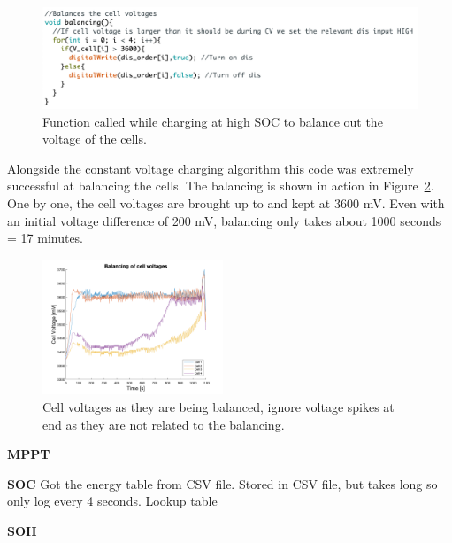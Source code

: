 \documentclass[a4paper]{article}
\begin{document}
\begin{figure}[H]
    \centering
    \includegraphics[width = \textwidth]{Balancing_code.png}
    \caption{Function called while charging at high SOC to balance out the voltage of the cells.}
    \vspace{-10pt}
    \label{fig:balancingCode}
\end{figure}

Alongside the constant voltage charging algorithm this code was extremely 
successful at balancing the cells. The balancing is shown in action in Figure~\ref{fig:balancing}. 
One by one, the cell voltages are brought up to and kept at 3600 mV. Even with 
an initial voltage difference of 200 mV, balancing only takes about 
1000 seconds = 17 minutes. 


\begin{figure}[H]
    \centering
    \includegraphics[width=0.48\textwidth]{balancing.png}
    \caption{Cell voltages as they are being balanced, ignore voltage spikes at end as they are not related to the balancing.}
    \label{fig:balancing}
\end{figure}

\textbf{MPPT}
\vspace{10pt} 
\newline

\textbf{SOC}
\vspace{10pt} 
\newline
Got the energy table from CSV file.
Stored in CSV file, but takes long so only log every 4 seconds.
Lookup table

\textbf{SOH}
\vspace{10pt} 
\newline
\end{document}
